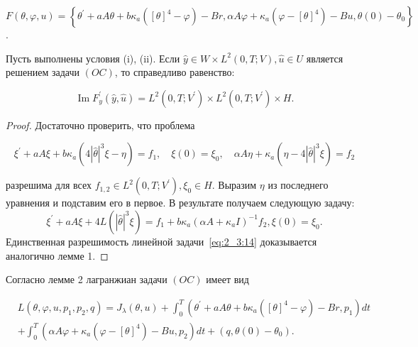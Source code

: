 $F(\theta, \varphi, u)=\left\{\theta^{\prime}+
a A \theta+b \kappa_{a}\left([\theta]^{4}-\varphi\right)-B r,
\alpha A \varphi+\kappa_{a}\left(\varphi-[\theta]^{4}\right)-B u, \theta(0)-\theta_{0}\right\}$.

\begin{lemma}
    \label{lm:2_3:2}
    Пусть выполнены условия (i), (ii).
    Если $\widehat{y} \in W \times L^{2}(0, T ; V), \widehat{u} \in U$
    является решением задачи $(OC)$, то справедливо равенство:

    \[
        \operatorname{Im} F_{y}^{\prime}
        (\widehat{y}, \widehat{u})=L^{2}\left(0, T; V^{\prime}\right)
        \times L^{2}\left(0, T; V^{\prime}\right) \times H.
    \]
\end{lemma}

\begin{proof}
    Достаточно проверить, что проблема

    \[
        \xi^{\prime}+a A \xi+b \kappa_{a}\left(4|\widehat{\theta}|^{3}
        \xi-\eta\right)=f_{1}, \quad \xi(0)=\xi_{0},
        \quad \alpha A \eta+\kappa_{a}\left(\eta-4|\widehat{\theta}|^{3} \xi\right)=f_{2}
    \]

    разрешима для всех $f_{1,2} \in L^{2}\left(0, T; V^{\prime}\right), \xi_{0} \in H$.
    Выразим $\eta$ из последнего уравнения и подставим его в первое.
    В результате получаем следующую задачу:
    \begin{equation}
        \label{eq:2_3:14}
        \xi^{\prime}+a A \xi+4 L\left(|\widehat{\theta}|^{3}
        \xi\right)=f_{1}+b \kappa_{a}\left(\alpha A+\kappa_{a}
        I\right)^{-1} f_{2}, \xi(0)=\xi_{0}.
    \end{equation}
    Единственная разрешимость линейной задачи~\eqref{eq:2_3:14}
    доказывается аналогично лемме 1.
\end{proof}


Согласно лемме 2 лагранжиан задачи $(OC)$ имеет вид

\[
    \begin{aligned}
        & L\left(\theta, \varphi, u, p_{1}, p_{2}, q\right)=
        J_{\lambda}(\theta, u) +\int_{0}^{T}\left(\theta^{\prime}
        + a A \theta+b \kappa_{a}\left([\theta]^{4}-\varphi\right)
        - B r, p_{1}\right) d t \\
        & + \int_{0}^{T}\left(\alpha A \varphi
        + \kappa_{a}\left(\varphi-[\theta]^{4}\right)
        -B u, p_{2}\right) d t+\left(q, \theta(0)-\theta_{0}\right).
    \end{aligned}
\]

